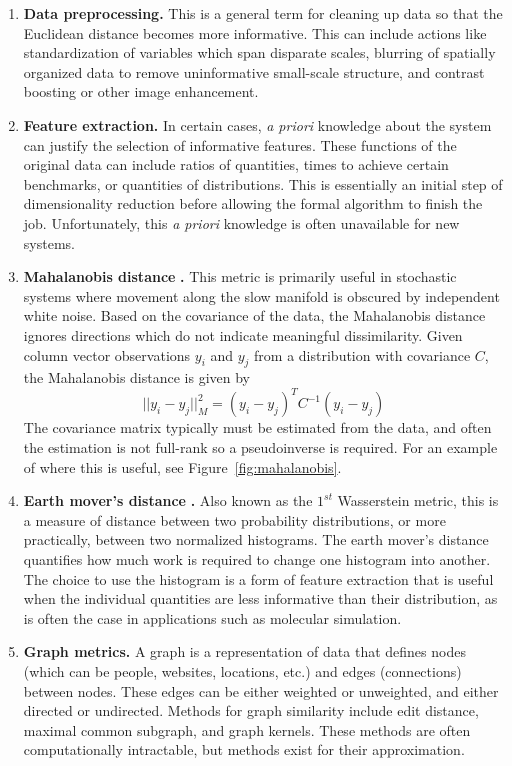 \documentclass[12pt]{article}
\begin{document}
\begin{enumerate}
\item \textbf{Data preprocessing.}  This is a general term for cleaning up data so that the Euclidean distance becomes more informative. This can include actions like standardization of variables which span disparate scales, blurring of spatially organized data to remove uninformative small-scale structure, and contrast boosting or other image enhancement.
\item \textbf{Feature extraction.} In certain cases, \textit{a priori} knowledge about the system can justify the selection of informative features. These functions of the original data can include ratios of quantities, times to achieve certain benchmarks, or quantities of distributions. This is essentially an initial step of dimensionality reduction before allowing the formal algorithm to finish the job. Unfortunately, this \textit{a priori} knowledge is often unavailable for new systems.
\item \textbf{Mahalanobis distance }\cite{Dsilva2015, Dsilva, Mahalanobis1936}\textbf{.}  This metric is primarily useful in stochastic systems where movement along the slow manifold is obscured by independent white noise. Based on the covariance of the data, the Mahalanobis distance ignores directions which do not indicate meaningful dissimilarity. Given column vector observations $y_i$ and $y_j$ from a distribution with covariance $C$, the Mahalanobis distance is given by
\[
||y_i-y_j||^2_M = (y_i-y_j)^TC^{-1}(y_i-y_j)
\]
The covariance matrix typically must be estimated from the data, and often the estimation is not full-rank so a pseudoinverse is required. For an example of where this is useful, see Figure~\ref{fig:mahalanobis}.
\item \textbf{Earth mover's distance }\cite{Levina2001}\textbf{.}   Also known as the $1^{st}$ Wasserstein metric, this is a measure of distance between two probability distributions, or more practically, between two normalized histograms. The earth mover's distance quantifies how much work is required to change one histogram into another. The choice to use the histogram is a form of feature extraction that is useful when the individual quantities are less informative than their distribution, as is often the case in applications such as molecular simulation.
\item \textbf{Graph metrics.} A graph is a representation of data that defines nodes (which can be people, websites, locations, etc.) and edges (connections) between nodes. These edges can be either weighted or unweighted, and either directed or undirected. Methods for graph similarity include edit distance, maximal common subgraph, and graph kernels. These methods are often computationally intractable, but methods exist for their approximation.
\end{enumerate}
\end{document}
